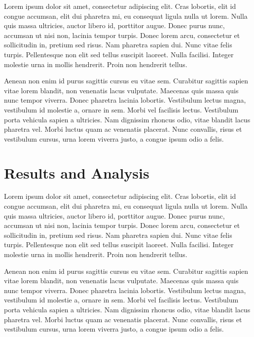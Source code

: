 \documentclass[a4paper]{article}
\begin{document}
Lorem ipsum dolor sit amet, consectetur adipiscing elit. Cras lobortis, elit id congue accumsan, elit dui pharetra mi, eu consequat ligula nulla ut lorem. Nulla quis massa ultricies, auctor libero id, porttitor augue. Donec purus nunc, accumsan ut nisi non, lacinia tempor turpis. Donec lorem arcu, consectetur et sollicitudin in, pretium sed risus. Nam pharetra sapien dui. Nunc vitae felis turpis. Pellentesque non elit sed tellus suscipit laoreet. Nulla facilisi. Integer molestie urna in mollis hendrerit. Proin non hendrerit tellus.

Aenean non enim id purus sagittis cursus eu vitae sem. Curabitur sagittis sapien vitae lorem blandit, non venenatis lacus vulputate. Maecenas quis massa quis nunc tempor viverra. Donec pharetra lacinia lobortis. Vestibulum lectus magna, vestibulum id molestie a, ornare in sem. Morbi vel facilisis lectus. Vestibulum porta vehicula sapien a ultricies. Nam dignissim rhoncus odio, vitae blandit lacus pharetra vel. Morbi luctus quam ac venenatis placerat. Nunc convallis, risus et vestibulum cursus, urna lorem viverra justo, a congue ipsum odio a felis.

\section{Results and Analysis}

%

Lorem ipsum dolor sit amet, consectetur adipiscing elit. Cras lobortis, elit id congue accumsan, elit dui pharetra mi, eu consequat ligula nulla ut lorem. Nulla quis massa ultricies, auctor libero id, porttitor augue. Donec purus nunc, accumsan ut nisi non, lacinia tempor turpis. Donec lorem arcu, consectetur et sollicitudin in, pretium sed risus. Nam pharetra sapien dui. Nunc vitae felis turpis. Pellentesque non elit sed tellus suscipit laoreet. Nulla facilisi. Integer molestie urna in mollis hendrerit. Proin non hendrerit tellus.

Aenean non enim id purus sagittis cursus eu vitae sem. Curabitur sagittis sapien vitae lorem blandit, non venenatis lacus vulputate. Maecenas quis massa quis nunc tempor viverra. Donec pharetra lacinia lobortis. Vestibulum lectus magna, vestibulum id molestie a, ornare in sem. Morbi vel facilisis lectus. Vestibulum porta vehicula sapien a ultricies. Nam dignissim rhoncus odio, vitae blandit lacus pharetra vel. Morbi luctus quam ac venenatis placerat. Nunc convallis, risus et vestibulum cursus, urna lorem viverra justo, a congue ipsum odio a felis.
\end{document}
